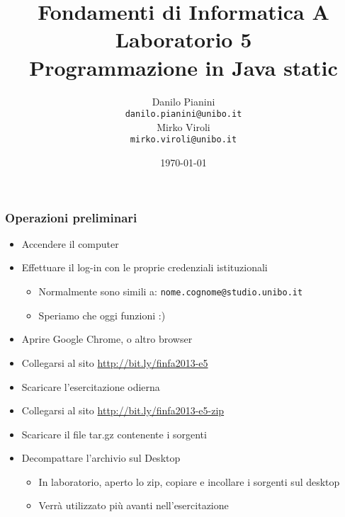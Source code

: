 \documentclass{beamer}
\begin{document}
\title[Lab1 - FV]{Fondamenti di Informatica A \\ Laboratorio 5 \\ Programmazione in Java static}
\author[Danilo Pianini]{Danilo Pianini\\\texttt{danilo.pianini@unibo.it} \\ \vspace{3pt} Mirko Viroli\\\texttt{mirko.viroli@unibo.it} }
\date[\today]{\today}

\frame{\titlepage} 

\begin{frame}
\frametitle{Operazioni preliminari}
\begin{itemize}
 \item Accendere il computer
 \item Effettuare il log-in con le proprie credenziali istituzionali
  \begin{itemize}
    \item Normalmente sono simili a: \texttt{nome.cognome@studio.unibo.it}
    \item Speriamo che oggi funzioni :)
  \end{itemize}
 \item Aprire Google Chrome, o altro browser
 \item Collegarsi al sito \url{http://bit.ly/finfa2013-e5}
 \item Scaricare l'esercitazione odierna
 \item Collegarsi al sito \url{http://bit.ly/finfa2013-e5-zip}
 \item Scaricare il file tar.gz contenente i sorgenti
 \item Decompattare l'archivio sul Desktop
  \begin{itemize}
    \item In laboratorio, aperto lo zip, copiare e incollare i sorgenti sul desktop
    \item Verrà utilizzato più avanti nell'esercitazione
  \end{itemize}
\end{itemize}
\end{frame}
\end{document}
